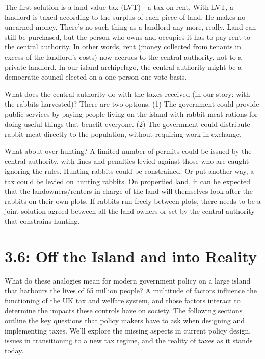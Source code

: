 \documentclass[]{tufte-handout}
\begin{document}
The first solution is a land value tax (LVT) - a tax on rent. With LVT,
a landlord is taxed according to the surplus of each piece of land. He
makes no unearned money. There's no such thing as a landlord any more,
really. Land can still be purchased, but the person who owns and
occupies it has to pay rent to the central authority. In other words,
rent (money collected from tenants in excess of the landlord's costs)
now accrues to the central authority, not to a private landlord. In our
island archipelago, the central authority might be a democratic council
elected on a one-person-one-vote basis.

What does the central authority do with the taxes received (in our
story: with the rabbits harvested)? There are two options: (1) The
government could provide public services by paying people living on the
island with rabbit-meat rations for doing useful things that benefit
everyone. (2) The government could distribute rabbit-meat directly to
the population, without requiring work in exchange.

What about over-hunting? A limited number of permits could be issued by
the central authority, with fines and penalties levied against those who
are caught ignoring the rules. Hunting rabbits could be constrained. Or
put another way, a tax could be levied on hunting rabbits. On propertied
land, it can be expected that the landowners/renters in charge of the
land will themselves look after the rabbits on their own plots. If
rabbits run freely between plots, there needs to be a joint solution
agreed between all the land-owners or set by the central authority that
constrains hunting.

\hypertarget{off-the-island-and-into-reality}{%
\section{3.6: Off the Island and into
Reality}\label{off-the-island-and-into-reality}}

What do these analogies mean for modern government policy on a large
island that harbours the lives of 65 million people? A multitude of
factors influence the functioning of the UK tax and welfare system, and
those factors interact to determine the impacts these controls have on
society. The following sections outline the key questions that policy
makers have to ask when designing and implementing taxes. We'll explore
the missing aspects in current policy design, issues in transitioning to
a new tax regime, and the reality of taxes as it stands today.
\end{document}
